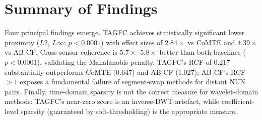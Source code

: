 \section{Summary of Findings}

Four principal findings emerge. TAGFC achieves statistically significant lower proximity ($L2$, $L\infty$; $p < 0.0001$) with effect sizes of $2.84\times$ vs CoMTE and $4.39\times$ vs AB-CF. Cross-sensor coherence is $5.7\times$–$5.8\times$ better than both baselines ($p < 0.0001$), validating the Mahalanobis penalty. TAGFC's RCF of 0.217 substantially outperforms CoMTE (0.647) and AB-CF (1.027); AB-CF's RCF $> 1$ exposes a fundamental failure of segment-swap methods for distant NUN pairs. Finally, time-domain sparsity is not the correct measure for wavelet-domain methods: TAGFC's near-zero score is an inverse-DWT artefact, while coefficient-level sparsity (guaranteed by soft-thresholding) is the appropriate measure.
